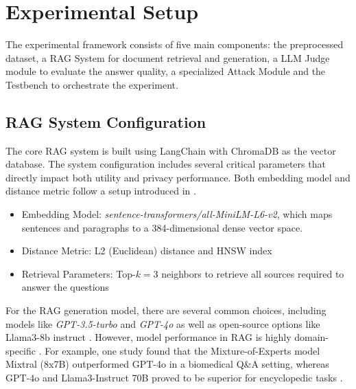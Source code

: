 \section{Experimental Setup}
The experimental framework consists of five main components: the preprocessed dataset, a \ac{RAG} System for document retrieval and generation, a LLM Judge module to evaluate the answer quality, a specialized Attack Module and the Testbench to orchestrate the experiment.

\subsection{RAG System Configuration}\label{evaluation-subsec:sys-config}
The core \ac{RAG} system is built using LangChain with ChromaDB as the vector database. The system configuration includes several critical parameters that directly impact both utility and privacy performance. Both embedding model and distance metric follow a setup introduced in \cite{goodAndBad}.
\begin{itemize}
    \item Embedding Model: \textit{sentence-transformers/all-MiniLM-L6-v2}, which maps sentences and paragraphs to a 384-dimensional dense vector space.
    \item Distance Metric: L2 (Euclidean) distance and HNSW index
    \item Retrieval Parameters: Top-$k=3$ neighbors to retrieve all sources required to answer the questions
\end{itemize}


For the RAG generation model, there are several common choices, including models like \textit{GPT-3.5-turbo} and \textit{GPT-4o} \cite{gpt4oModel} as well as open-source options like Llama3-8b instruct \cite{llama3Model}. However, model performance in RAG is highly domain-specific \cite{modelChoiceRAG}. For example, one study found that the Mixture-of-Experts model Mixtral (8x7B) \cite{mixtralModel} outperformed GPT-4o in a biomedical Q\&A setting, whereas GPT-4o and Llama3-Instruct 70B proved to be superior for encyclopedic tasks \cite{modelChoiceRAG}.

